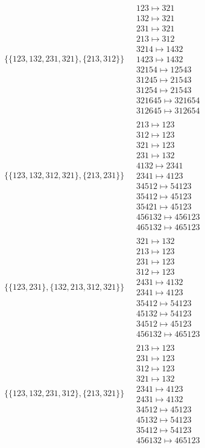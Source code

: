 \begin{scriptsize}
\begin{align}
\begin{matrix}
\end{matrix}
\\
\{\{123, 132, 231, 321\}, \{213, 312\}\}
\ 
&
\begin{matrix}
123 \mapsto 321\\132 \mapsto 321\\231 \mapsto 321\\213 \mapsto 312\\3214 \mapsto 1432\\1423 \mapsto 1432\\32154 \mapsto 12543\\31245 \mapsto 21543\\31254 \mapsto 21543\\321645 \mapsto 321654\\312645 \mapsto 312654
\end{matrix}
\\
\{\{123, 132, 312, 321\}, \{213, 231\}\}
\ 
&
\begin{matrix}
213 \mapsto 123\\312 \mapsto 123\\321 \mapsto 123\\231 \mapsto 132\\4132 \mapsto 2341\\2341 \mapsto 4123\\34512 \mapsto 54123\\35412 \mapsto 45123\\35421 \mapsto 45123\\456132 \mapsto 456123\\465132 \mapsto 465123
\end{matrix}
\\
\{\{123, 231\}, \{132, 213, 312, 321\}\}
\ 
&
\begin{matrix}
321 \mapsto 132\\213 \mapsto 123\\231 \mapsto 123\\312 \mapsto 123\\2431 \mapsto 4132\\2341 \mapsto 4123\\35412 \mapsto 54123\\45132 \mapsto 54123\\34512 \mapsto 45123\\456132 \mapsto 465123
\end{matrix}
\\
\{\{123, 132, 231, 312\}, \{213, 321\}\}
\ 
&
\begin{matrix}
213 \mapsto 123\\231 \mapsto 123\\312 \mapsto 123\\321 \mapsto 132\\2341 \mapsto 4123\\2431 \mapsto 4132\\34512 \mapsto 45123\\45132 \mapsto 54123\\35412 \mapsto 54123\\456132 \mapsto 465123

\end{matrix}
\end{align}
\end{scriptsize}
